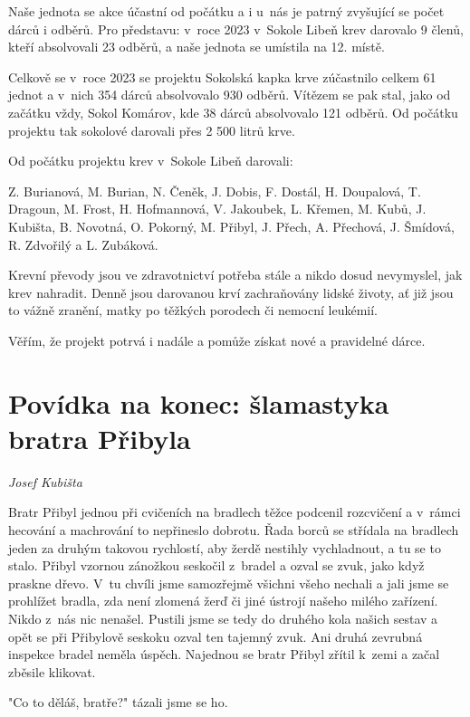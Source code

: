 \documentclass[a5paper, 11pt, twoside]{article}
\begin{document}
Naše jednota se akce účastní od počátku a i u~nás je patrný zvyšující se
počet dárců i odběrů. Pro představu: v~roce 2023 v~Sokole Libeň krev
darovalo 9 členů, kteří absolvovali 23 odběrů, a naše jednota se
umístila na 12. místě.

Celkově se v~roce 2023 se projektu Sokolská kapka krve zúčastnilo celkem
61 jednot a v~nich 354 dárců absolvovalo 930 odběrů. Vítězem se pak
stal, jako od začátku vždy, Sokol Komárov, kde 38 dárců absolvovalo 121
odběrů. Od počátku projektu tak sokolové darovali přes 2 500 litrů krve.

Od počátku projektu krev v~Sokole Libeň darovali:

Z. Burianová, M. Burian, N. Čeněk, J. Dobis, F. Dostál, H. Doupalová, T.
Dragoun, M. Frost, H. Hofmannová, V. Jakoubek, L. Křemen, M. Kubů, J.
Kubišta, B. Novotná, O. Pokorný, M. Přibyl, J. Přech, A. Přechová, J.
Šmídová, R. Zdvořilý a L. Zubáková.

Krevní převody jsou ve zdravotnictví potřeba stále a nikdo dosud
nevymyslel, jak krev nahradit. Denně jsou darovanou krví zachraňovány
lidské životy, ať již jsou to vážně zranění, matky po těžkých porodech
či nemocní leukémií.

Věřím, že projekt potrvá i nadále a pomůže získat nové a pravidelné
dárce.

\section{Povídka na konec: šlamastyka bratra
Přibyla}

\begin{center}
\textit{Josef Kubišta}
\end{center}

Bratr Přibyl jednou při cvičeních na bradlech těžce podcenil rozcvičení
a v~rámci hecování a machrování to nepřineslo dobrotu. Řada borců se
střídala na bradlech jeden za druhým takovou rychlostí, aby žerdě
nestihly vychladnout, a tu se to stalo. Přibyl vzornou zánožkou seskočil
z~bradel a ozval se zvuk, jako když praskne dřevo. V~tu chvíli jsme
samozřejmě všichni všeho nechali a jali jsme se prohlížet bradla, zda
není zlomená žerď či jiné ústrojí našeho milého zařízení. Nikdo z~nás
nic nenašel. Pustili jsme se tedy do druhého kola našich sestav a opět
se při Přibylově seskoku ozval ten tajemný zvuk. Ani druhá zevrubná
inspekce bradel neměla úspěch. Najednou se bratr Přibyl zřítil k~zemi a
začal zběsile klikovat.

"Co to děláš, bratře?" tázali jsme se ho.
\end{document}

